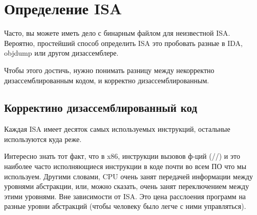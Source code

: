 \section{Определение \ac{ISA}}
\label{ISA_detect}

Часто, вы можете иметь дело с бинарным файлом для неизвестной \ac{ISA}.
Вероятно, простейший способ определить \ac{ISA} это пробовать разные в IDA, objdump или другом дизассемблере.

Чтобы этого достичь, нужно понимать разницу между некорректно дизассемблированным кодом, и корректно дизассемблированным.

\renewcommand{\CURPATH}{digging_into_code/incorrect_disassembly}


\subsection{Корректино дизассемблированный код}
\label{correctly_disasmed_code}

Каждая \ac{ISA} имеет десяток самых используемых инструкций, остальные используются куда реже.

Интересно знать тот факт, что в x86, инструкции вызовов ф-ций (\PUSH/\CALL/\ADD) и \MOV
это наиболее часто исполняющиеся инструкции в коде почти во всем ПО что мы используем.
Другими словами, \ac{CPU} очень занят передачей информации между уровнями абстракции, или, можно сказать, очень занят
переключением между этими уровнями.
Вне зависимости от \ac{ISA}.
Это цена расслоения программ на разные уровни абстракций (чтобы человеку было легче с ними управляться).

